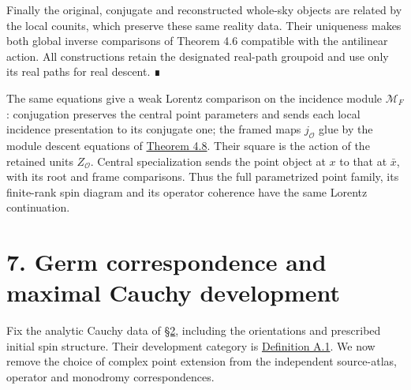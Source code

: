 \documentclass[
  english,
  11pt,
  reqno]{amsart}
\begin{document}
Finally the original, conjugate and reconstructed whole-sky objects are
related by the local counits, which preserve these same reality data.
Their uniqueness makes both global inverse comparisons of Theorem 4.6
compatible with the antilinear action. All constructions retain the
designated real-path groupoid and use only its real paths for real
descent. ∎

The same equations give a weak Lorentz comparison on the incidence
module \(\mathscr M_F\): conjugation preserves the central point
parameters and sends each local incidence presentation to its conjugate
one; the framed maps \(j_{\mathcal O}\) glue by the module descent
equations of
\hyperref[thm:global-parametrized-point-module-family]{Theorem 4.8}.
Their square is the action of the retained units \(Z_{\mathcal O}\).
Central specialization sends the point object at \(x\) to that at
\(\bar x\), with its root and frame comparisons. Thus the full
parametrized point family, its finite-rank spin diagram and its operator
coherence have the same Lorentz continuation.

\protect{}\label{sec:germ-correspondence-v08}

\section{7. Germ correspondence and maximal Cauchy
development}\label{germ-correspondence-and-maximal-cauchy-development}

Fix the analytic Cauchy data of \hyperref[sec:local-input-v08]{§2},
including the orientations and prescribed initial spin structure. Their
development category is \hyperref[def:analytic-ghd-v2]{Definition A.1}.
We now remove the choice of complex point extension from the independent
source-atlas, operator and monodromy correspondences.
\end{document}
